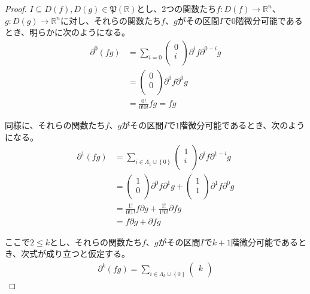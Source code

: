 \documentclass[dvipdfmx]{jsarticle}
\begin{document}
\begin{proof}
$I \subseteq D(f),D(g)\in \mathfrak{P}\left( \mathbb{R} \right)$とし、2つの関数たち$f:D(f) \rightarrow \mathbb{R}^{n}$、$g:D(g) \rightarrow \mathbb{R}^{n}$に対し、それらの関数たち$f$、$g$がその区間$I$で$0$階微分可能であるとき、明らかに次のようになる。
\begin{align*}
\partial^{0}(fg) &= \sum_{i = 0} {\begin{pmatrix}
0 \\
i \\
\end{pmatrix}\partial^{i}f\partial^{0 - i}g}\\
&= \begin{pmatrix}
0 \\
0 \\
\end{pmatrix}\partial^{0}f\partial^{0}g\\
&= \frac{0!}{0!0!}fg = fg
\end{align*}\par
同様に、それらの関数たち$f$、$g$がその区間$I$で$1$階微分可能であるとき、次のようになる。
\begin{align*}
\partial^{1}(fg) &= \sum_{i \in \varLambda_{1} \cup \left\{ 0 \right\}} {\begin{pmatrix}
1 \\
i \\
\end{pmatrix}\partial^{i}f\partial^{1 - i}g}\\
&= \begin{pmatrix}
1 \\
0 \\
\end{pmatrix}\partial^{0}f\partial^{1}g + \begin{pmatrix}
1 \\
1 \\
\end{pmatrix}\partial^{1}f\partial^{0}g\\
&= \frac{1!}{0!1!}f\partial g + \frac{1!}{1!0!}\partial fg\\
&= f\partial g + \partial fg
\end{align*}\par
ここで$2 \leq k$とし、それらの関数たち$f$、$g$がその区間$I$で$k + 1$階微分可能であるとき、次式が成り立つと仮定する。
\begin{align*}
\partial^{k}(fg) = \sum_{i \in \varLambda_{k} \cup \left\{ 0 \right\}} {\begin{pmatrix}
k \\

\end{pmatrix}}
\end{align*}
\end{proof}
\end{document}
